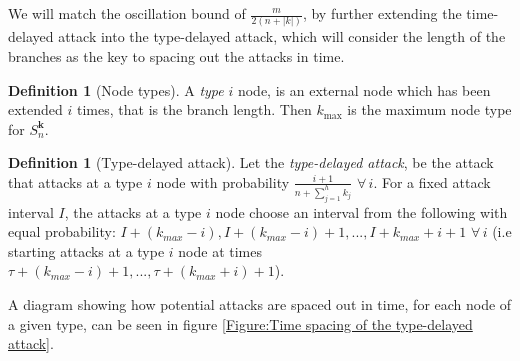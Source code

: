 \documentclass[a4paper,10pt]{article}
\newcommand{\denominator}{\ensuremath{n+\sum\limits_{j=1}^{h} k_{j}}}
\theoremstyle{definition}
\newtheorem{definition}[theorem]{Definition}
\theoremstyle{definition}
\theoremstyle{remark}
\theoremstyle{definition}
\begin{document}
We will match the oscillation bound of $\frac{m}{2(n+|k|)}$, by further extending the time-delayed attack into the type-delayed attack, which will consider the length of the branches as the key to spacing out the attacks in time.

\begin{definition}[Node types]
A \textit{type} $i$ node, is an external node which has been extended $i$ times, that is the branch length. Then $k_{\max}$ is the maximum node type for $S_{n}^{\bm{k}}$.
\end{definition}

\begin{definition}[Type-delayed attack]
Let the \textit{type-delayed attack}, be the attack that attacks at a type $i$ node with probability $\frac{i+1}{\denominator}$ $\forall \, i$. For a fixed attack interval $I$, the attacks at a type $i$ node choose an interval from the following with equal probability: $I+(k_{max}-i),I+(k_{max}-i)+1,...,I+k_{max}+i+1$ $\forall \, i$ (i.e starting attacks at a type $i$ node at times $\tau+(k_{max}-i)+1,...,\tau+(k_{max}+i)+1$).
\end{definition}

A diagram showing how potential attacks are spaced out in time, for each node of a given type, can be seen in figure \ref{Figure:Time spacing of the type-delayed attack}.
\end{document}
